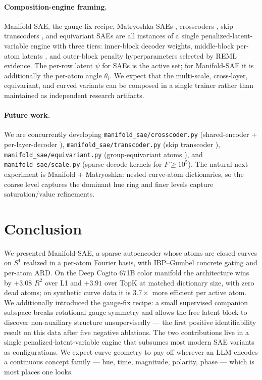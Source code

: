 \documentclass[10pt,twocolumn]{article}
\begin{document}
\paragraph{Composition-engine framing.} Manifold-SAE, the gauge-fix recipe,
Matryoshka SAEs \cite{bussmann2025feature}, crosscoders
\cite{lindsey2024crosscoders}, skip transcoders \cite{paulo2025sparse}, and
equivariant SAEs \cite{khemlani2024equivariant} are all instances of a single
penalized-latent-variable engine \cite{wood2017gam} with three tiers:
inner-block decoder weights, middle-block per-atom latents
\cite{lawrence2004gplvm}, and outer-block penalty hyperparameters selected by
REML evidence. The per-row latent $\psi$ for SAEs is the active set; for
Manifold-SAE it is additionally the per-atom angle $\theta_i$. We expect that
the multi-scale, cross-layer, equivariant, and curved variants can be composed
in a single trainer rather than maintained as independent research artifacts.

\paragraph{Future work.} We are concurrently developing
\texttt{manifold\_sae/crosscoder.py} (shared-encoder + per-layer-decoder
\cite{lindsey2024crosscoders}), \texttt{manifold\_sae/transcoder.py}
(skip transcoder \cite{paulo2025sparse}), \texttt{manifold\_sae/equivariant.py}
(group-equivariant atoms \cite{khemlani2024equivariant}), and
\texttt{manifold\_sae/scale.py} (sparse-decode kernels for $F{\geq}10^5$).
The natural next experiment is Manifold + Matryoshka: nested curve-atom
dictionaries, so the coarse level captures the dominant hue ring and finer
levels capture saturation/value refinements.

\section{Conclusion}
\label{sec:conclusion}

We presented Manifold-SAE, a sparse autoencoder whose atoms are closed curves
on $S^1$ realized in a per-atom Fourier basis, with IBP--Gumbel concrete
gating and per-atom ARD. On the Deep Cogito 671B color manifold the
architecture wins by $+3.08$ $R^2$ over L1 and $+3.91$ over TopK at matched
dictionary size, with zero dead atoms; on synthetic curve data it is
$3.7\times$ more efficient per active atom. We additionally introduced the
gauge-fix recipe: a small supervised companion subspace breaks rotational
gauge symmetry and allows the free latent block to discover non-auxiliary
structure unsupervisedly --- the first positive identifiability result on this
data after five negative ablations. The two contributions live in a single
penalized-latent-variable engine that subsumes most modern SAE variants as
configurations. We expect curve geometry to pay off wherever an LLM encodes a
continuous concept family --- hue, time, magnitude, polarity, phase --- which
is most places one looks.

\small


\end{document}
